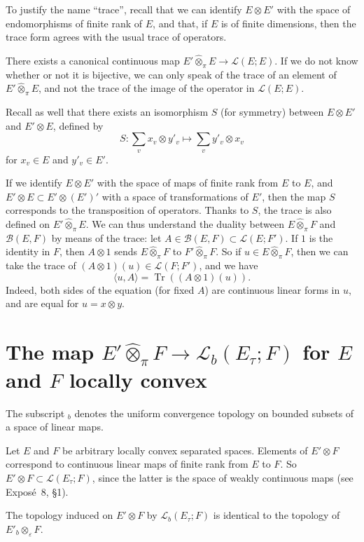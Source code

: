\documentclass{article}
\theoremstyle{plain}
\newenvironment{proposition}[1]
    {\renewcommand\theinnercustomproposition{#1}\innercustomproposition}
    {\endinnercustomproposition}
\theoremstyle{definition}
\newcommand{\BB}{\mathcal{B}}
\newcommand{\LL}{\mathcal{L}}
\newcommand{\injotimes}{{\otimes}_\varepsilon}
\newcommand{\cprojotimes}{\widehat{\otimes}_\pi}
\newcommand{\tr}{\operatorname{Tr}}
\newcommand{\oldpage}[1]{\marginpar{\footnotesize$\Big\vert$ \textit{p.~#1}}}
\begin{document}
To justify the name ``trace'', recall that we can identify $E\otimes E'$ with the space of endomorphisms of finite rank of $E$, and that, if $E$ is of finite dimensions, then the trace form agrees with the usual trace of operators.

There exists a canonical continuous map $E'\cprojotimes E\to\LL(E;E)$.
If we do not know whether or not it is bijective, we can only speak of the trace of an element of $E'\cprojotimes E$, and not the trace of the image of the operator in $\LL(E;E)$.

Recall as well that there exists an isomorphism $S$ (for symmetry) between $E\otimes E'$ and $E'\otimes E$, defined by
\[
  S\colon \sum_v x_v\otimes y'_v \mapsto \sum_v y'_v\otimes x_v
\]
for $x_v\in E$ and $y'_v\in E'$.

If we identify $E\otimes E'$ with the space of maps of finite rank from $E$ to $E$, and $E'\otimes E\subset E'\otimes(E')'$ with a space of transformations of $E'$,
\oldpage{2}
then the map $S$ corresponds to the transposition of operators.
Thanks to $S$, the trace is also defined on $E'\cprojotimes E$.
We can thus understand the duality between $E\cprojotimes F$ and $\BB(E,F)$ by means of the trace: let $A\in\BB(E,F)\subset\LL(E;F')$.
If $1$ is the identity in $F$, then $A\otimes1$ sends $E\cprojotimes F$ to $F'\cprojotimes F$.
So if $u\in E\cprojotimes F$, then we can take the trace of $(A\otimes1)(u)\in\LL(F;F')$, and we have
\[
\label{equation1}
  \langle u,A \rangle = \tr((A\otimes1)(u)).
  \tag{1}
\]
Indeed, both sides of the equation (for fixed $A$) are continuous linear forms in $u$, and are equal for $u=x\otimes y$.


\section{The map $E'\cprojotimes F\to\LL_b(E_\tau;F)$ for $E$ and $F$ locally convex}
\label{section2}

The subscript ${}_b$ denotes the uniform convergence topology on bounded subsets of a space of linear maps.

Let $E$ and $F$ be arbitrary locally convex separated spaces.
Elements of $E'\otimes F$ correspond to continuous linear maps of finite rank from $E$ to $F$.
So $E'\otimes F\subset\LL(E_\tau;F)$, since the latter is the space of weakly continuous maps (see Expos\'{e}~8, §1).

\begin{proposition}{1}
\label{proposition1}
  The topology induced on $E'\otimes F$ by $\LL_b(E_\tau;F)$ is identical to the topology of $E'_b\injotimes F$.
\end{proposition}
\end{document}
